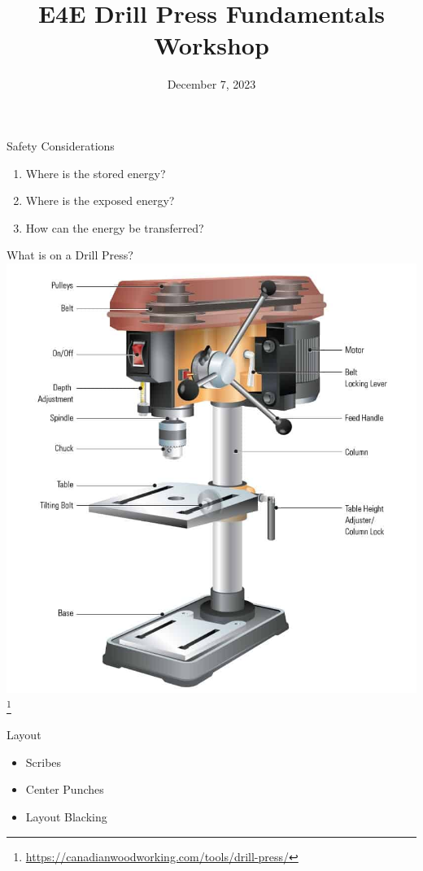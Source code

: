 \documentclass[aspectratio=169]{beamer}
\title{E4E Drill Press Fundamentals Workshop}
\institute{Engineers for Exploration, UC San Diego}
\date{December 7, 2023}
\begin{document}
\maketitle
\begin{frame}{Safety Considerations}
    \begin{enumerate}
        \item Where is the stored energy?
        \item Where is the exposed energy?
        \item How can the energy be transferred?
    \end{enumerate}
\end{frame}
\begin{frame}{What is on a Drill Press?}
    \centering
    \includegraphics[height=0.7\textheight]{drill_press_anatomy.jpg} \footnote{\url{https://canadianwoodworking.com/tools/drill-press/}}
\end{frame}
\begin{frame}{Layout}
    \begin{itemize}
        \item Scribes
        \item Center Punches
        \item Layout Blacking
    \end{itemize}
\end{frame}
\end{document}
